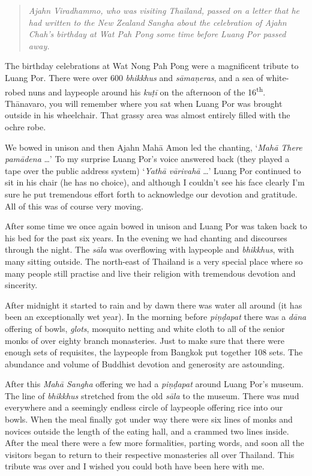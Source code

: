 
\begin{quote}\itshape
Ajahn Viradhammo, who was visiting Thailand, passed on a
letter that he had written to the New Zealand Sangha about the
celebration of Ajahn Chah's birthday at Wat Pah Pong some time before
Luang Por passed away.
\end{quote}

\noindent
The birthday celebrations at Wat Nong Pah Pong were a magnificent
tribute to Luang Por. There were over 600 \emph{bhikkhus} and
\emph{sāmaṇeras}, and a sea of white-robed nuns and laypeople around his
\emph{kuṭī} on the afternoon of the 16\textsuperscript{th}. Thānavaro,
you will remember where you sat when Luang Por was brought outside in
his wheelchair. That grassy area was almost entirely filled with the
ochre robe.

We bowed in unison and then Ajahn Mahā Amon led the chanting, `\emph{Mahā There
pamādena} \ldots{}' To my surprise Luang Por's voice answered back (they played
a tape over the public address system) `\emph{Yathā vārivahā} \ldots{}' Luang
Por continued to sit in his chair (he has no choice), and although I couldn't
see his face clearly I'm sure he put tremendous effort forth to acknowledge our
devotion and gratitude. All of this was of course very moving.

After some time we once again bowed in unison and Luang Por was taken
back to his bed for the past six years. In the evening we had chanting
and discourses through the night. The \emph{sāla} was overflowing with
laypeople and \emph{bhikkhus}, with many sitting outside. The
north-east of Thailand is a very special place where so many people
still practise and live their religion with tremendous devotion and
sincerity.

After midnight it started to rain and by dawn there was water all around
 (it has been an exceptionally wet year). In the morning before
\emph{piṇḍapat} there was a \emph{dāna} offering of bowls, \emph{glots},
mosquito netting and white cloth to all of the senior monks of over
eighty branch monasteries. Just to make sure that there were enough sets
of requisites, the laypeople from Bangkok put together 108 sets. The
abundance and volume of Buddhist devotion and generosity are astounding.

After this \emph{Mahā Sangha} offering we had a \emph{piṇḍapat} around
Luang Por's museum. The line of \emph{bhikkhus} stretched from the old
\emph{sāla} to the museum. There was mud everywhere and a seemingly
endless circle of laypeople offering rice into our bowls. When the meal
finally got under way there were six lines of monks and novices outside
the length of the eating hall, and a crammed two lines inside. After the
meal there were a few more formalities, parting words, and soon all the
visitors began to return to their respective monasteries all over
Thailand. This tribute was over and I wished you could both have been
here with me. 

